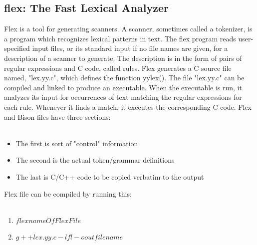 \subsection{flex: The Fast Lexical Analyzer}
Flex is a tool for generating scanners. A scanner, sometimes called a tokenizer, is a program which recognizes lexical patterns in text. The flex program reads user-specified input files, or its standard input if no file names are given, for a description of a scanner to generate. The description is in the form of pairs of regular expressions and C code, called rules. Flex generates a C source file named, "lex.yy.c", which defines the function yylex(). The file "lex.yy.c" can be compiled and linked to produce an executable. When the executable is run, it analyzes its input for occurrences of text matching the regular expressions for each rule. Whenever it finds a match, it executes the corresponding C code.
Flex and Bison files have three sections:\\\\
\begin{itemize}
\item The first is sort of "control" information
\item The second is the actual token/grammar definitions
\item The last is C/C++ code to be copied verbatim to the output
\end{itemize}

Flex file can be compiled by running this:\\\\
\begin{enumerate}
\item $ flex nameOfFlexFile $
\item $ g++ lex.yy.c -lfl -o outfilename $
\end{enumerate}



